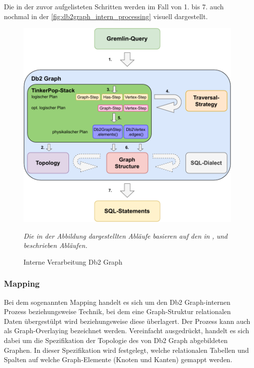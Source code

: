 Die in der zuvor aufgelisteten Schritten werden im Fall von 1. bis 7. auch nochmal in der \autoref{fig:db2graph_intern_processing} visuell dargestellt.

\begin{figure}[ht]
    \centering
    \includegraphics[width=\textwidth]{images/db2graph_intern_processing.pdf}
    \caption{Interne Verarbeitung Db2 Graph}
    \label{fig:db2graph_intern_processing}
    \vspace{1em}
    \textit{Die in der Abbildung dargestellten Abläufe basieren auf den in} \cite{yt_tian}\textit{,} \cite{vldb_tian} \textit{und} \cite{sigmod_tian} \textit{beschrieben Abläufen.} 
\end{figure}

\subsubsection{Mapping}
Bei dem sogenannten Mapping handelt es sich um den Db2 Graph-internen Prozess beziehungsweise Technik, bei dem eine Graph-Struktur relationalen Daten überge\-stülpt wird beziehungsweise diese überlagert. Der Prozess kann auch als Graph-Overlaying bezeichnet werden. Vereinfacht ausgedrückt, handelt es sich dabei um die Spezifikation der Topologie des von Db2 Graph abgebildeten Graphen. In dieser Spezifikation wird festgelegt, welche relationalen Tabellen und Spalten auf welche Graph-Elemente (Knoten und Kanten) gemappt werden. 


